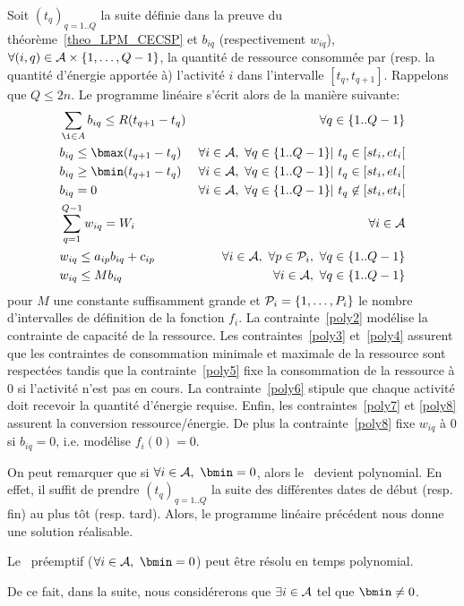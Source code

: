 Soit $(t_q)_{q=1..Q}$ la suite définie dans la preuve du
théorème~\ref{theo_LPM_CECSP} et $b_{iq}$ (respectivement $w_{iq}$),
$\forall (i,q) \in \A\times\{1,\dots,Q-1\}$, la
quantité de ressource consommée par (resp. la quantité d'énergie
apportée à) l'activité $i$ dans l'intervalle
$[t_q,t_{q+1}]$. Rappelons que $Q \le 2n$. Le programme linéaire
s'écrit alors de la manière suivante:
{\small
\begin{align}
&\sum_{\i \in A} b_{iq} \le R(t_{q+1}-t_q)  & \forall q\in
\{1..Q-1\} \label{poly2}\\
& b_{iq} \le \bmax(t_{q+1}-t_q)  & \forall i \in \A,\ \forall q \in \{1..Q-1\} |\
t_q \in [st_i,et_i[\label{poly3}\\
& b_{iq} \ge \bmin (t_{q+1}-t_q) & \forall i \in \A,\ \forall q \in \{1..Q-1\} |\ t_q
\in [st_i,et_i[\label{poly4}\\
 & b_{iq}=0 & \forall i \in \A,\ \forall q \in \{1..Q-1\} |\ t_q
\not\in [st_i,et_i[\label{poly5}\\ 
& \sum_{q=1}^{Q-1} w_{iq} = W_i & \forall i \in
\A\label{poly6}\\
 & w_{iq} \le a_{ip}b_{iq} + c_{ip} & \forall i \in \A,\ \forall p \in
\P_i,\ \forall q \in \{1..Q-1\}\label{poly7}\\ 
& w_{iq} \le Mb_{iq} & \forall i \in \A,\ \forall q \in
\{1..Q-1\}\label{poly8}
\end{align} }
\noindent
pour $M$ une constante suffisamment grande et $\P_i=\{1,\dots,P_i\}$
le nombre d'intervalles de définition de la fonction $f_i$. La
contrainte~\eqref{poly2} modélise la contrainte de capacité de la
ressource. Les contraintes~\eqref{poly3} et~\eqref{poly4} assurent que
les contraintes de consommation minimale et maximale de la ressource
sont respectées tandis que la contrainte~\eqref{poly5} fixe la
consommation de la ressource à $0$ si l'activité n'est pas en
cours. La contrainte~\eqref{poly6} stipule que chaque activité doit
recevoir la quantité d'énergie requise. Enfin, les
contraintes~\eqref{poly7} et \eqref{poly8} assurent la conversion
ressource/énergie. De plus la contrainte~\eqref{poly8} fixe $w_{iq}$ à
$0$ si $b_{iq}=0$, i.e. modélise $f_i(0)=0$.

On peut remarquer que si $\forall i \in \A,\ \bmin=0$, alors le
\CECSP~devient polynomial. En effet, il suffit de prendre 
$(t_q)_{q=1..Q}$ la suite des différentes dates de début (resp. fin)
au plus tôt (resp. tard). Alors, le programme linéaire précédent nous
donne une solution réalisable. 

\begin{theo}
Le \CECSP~préemptif ($\forall i \in \A,\ \bmin=0$) peut être résolu en
temps polynomial.
\end{theo}

De ce fait, dans la suite, nous considérerons que $\exists i \in \A$
tel que $\bmin\neq 0$.

